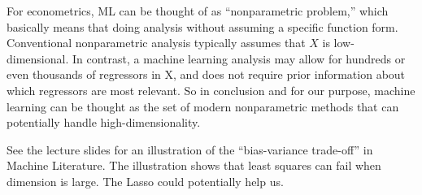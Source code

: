\documentclass[11pt,a4paper]{amsart}
\theoremstyle{plain}
\theoremstyle{definition}
\begin{document}
	For econometrics, ML can be thought of as “nonparametric problem,” which basically means that doing analysis without assuming a specific function form. Conventional nonparametric analysis typically assumes that $X$ is low-dimensional. In contrast, a machine learning analysis may allow for hundreds or even thousands of regressors in X, and does not require prior information about which regressors are most relevant. So in conclusion and for our purpose, machine learning can be thought as the set of modern nonparametric methods that can potentially handle high-dimensionality.\par 
	See the lecture slides for an illustration of the ``bias-variance trade-off'' in Machine Literature. The illustration shows that least squares can fail when dimension is large. The Lasso could potentially help us.
	
\end{document}
